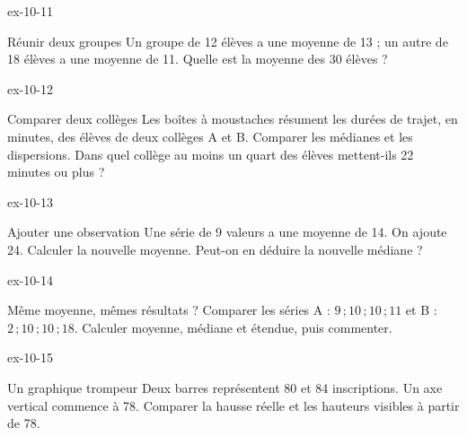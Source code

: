 \clearpage{}
\begin{blocLivre}{ex-10-11}\begin{exercice}[3]{Réunir deux groupes}
Un groupe de 12 élèves a une moyenne de 13 ; un autre de 18 élèves a une moyenne de 11. Quelle est la moyenne des 30 élèves ?
\end{exercice}\end{blocLivre}
\begin{blocLivre}{ex-10-12}\begin{exercice}[3]{Comparer deux collèges}
Les boîtes à moustaches résument les durées de trajet, en minutes, des élèves de deux collèges A et B. Comparer les médianes et les dispersions. Dans quel collège au moins un quart des élèves mettent-ils 22 minutes ou plus ?
\label{fig-ex-10-12}
\end{exercice}\end{blocLivre}
\begin{blocLivre}{ex-10-13}\begin{exercice}[3]{Ajouter une observation}
Une série de 9 valeurs a une moyenne de 14. On ajoute 24. Calculer la nouvelle moyenne. Peut-on en déduire la nouvelle médiane ?
\end{exercice}\end{blocLivre}
\begin{blocLivre}{ex-10-14}\begin{exercice}[3]{Même moyenne, mêmes résultats ?}
Comparer les séries A : $9\,;10\,;10\,;11$ et B : $2\,;10\,;10\,;18$. Calculer moyenne, médiane et étendue, puis commenter.
\end{exercice}\end{blocLivre}
\begin{blocLivre}{ex-10-15}\begin{exercice}[3]{Un graphique trompeur}
Deux barres représentent 80 et 84 inscriptions. Un axe vertical commence à 78. Comparer la hausse réelle et les hauteurs visibles à partir de 78.
\label{fig-ex-10-15}
\end{exercice}\end{blocLivre}

\clearpage
